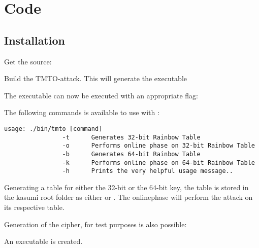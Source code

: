 \chapter{Code}
\section{Installation}
\label{sec:inst}
Get the source:

\quad{}

Build the TMTO-attack. This will generate the executable

\quad{}

The executable  can now be executed with an appropriate
flag:

\quad{}

The following commands is available to use with :
\begin{verbatim}
usage: ./bin/tmto [command] 
                -t      Generates 32-bit Rainbow Table 
                -o      Performs online phase on 32-bit Rainbow Table 
                -b      Generates 64-bit Rainbow Table 
                -k      Performs online phase on 64-bit Rainbow Table 
                -h      Prints the very helpful usage message.. 
\end{verbatim}

Generating a table for either the 32-bit or the 64-bit key, the table
is stored in the kasumi root folder as either  or
. The onlinephase will perform the attack on its
respective table.

Generation of the cipher, for test purposes is also possible:

\quad{}

An executable  is created. 
